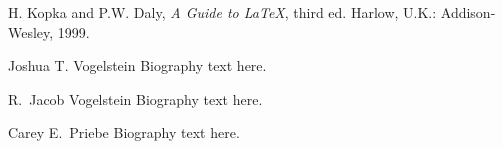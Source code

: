 \documentclass[10pt,journal,cspaper,compsoc]{IEEEtran}
\begin{document}
\ifCLASSOPTIONcaptionsoff
  \newpage
\fi


\IEEEtriggercmd{\enlargethispage{-5in}}



%
\begin{thebibliography}{1}

H. Kopka and P.W. Daly, \emph{A Guide to {\LaTeX}}, third ed. Harlow, U.K.: Addison-Wesley, 1999.


\end{thebibliography}


\begin{IEEEbiography}{Joshua T. Vogelstein}
Biography text here.
\end{IEEEbiography}

\begin{IEEEbiographynophoto}{R.\ Jacob Vogelstein}
Biography text here.
\end{IEEEbiographynophoto}

\newpage

\begin{IEEEbiographynophoto}{Carey E.\ Priebe}
Biography text here.
\end{IEEEbiographynophoto}






\end{document}
